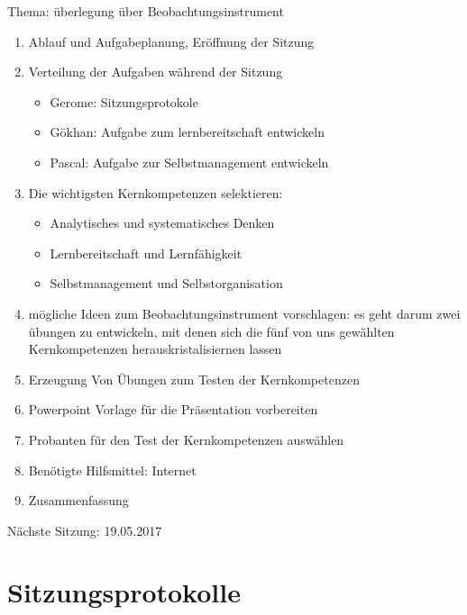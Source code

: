Thema: überlegung über Beobachtungsinstrument
\begin{enumerate}

\item Ablauf und Aufgabeplanung, Eröffnung der Sitzung 

\item  Verteilung der Aufgaben während der Sitzung
\begin{itemize}
\item Gerome: Sitzungsprotokole
\item Gökhan: Aufgabe zum lernbereitschaft entwickeln
\item Pascal: Aufgabe zur Selbstmanagement entwickeln
\end{itemize}


\item  Die wichtigsten Kernkompetenzen selektieren:
\begin{itemize}
\item Analytisches und systematisches Denken
\item Lernbereitschaft und Lernfähigkeit
\item Selbstmanagement und Selbstorganisation 
\end{itemize}

\item mögliche Ideen zum Beobachtungsinstrument vorschlagen: es geht darum zwei übungen zu entwickeln,  mit denen sich die fünf von uns gewählten Kernkompetenzen herauskristalisiernen lassen

\item Erzeugung Von Übungen zum Testen der Kernkompetenzen

\item Powerpoint Vorlage für die Präsentation vorbereiten	

\item Probanten für den Test der Kernkompetenzen auswählen


\item Benötigte Hilfsmittel: Internet 

\item Zusammenfassung

\end{enumerate}

Nächste Sitzung: 19.05.2017

\newpage
\section*{Sitzungsprotokolle}

